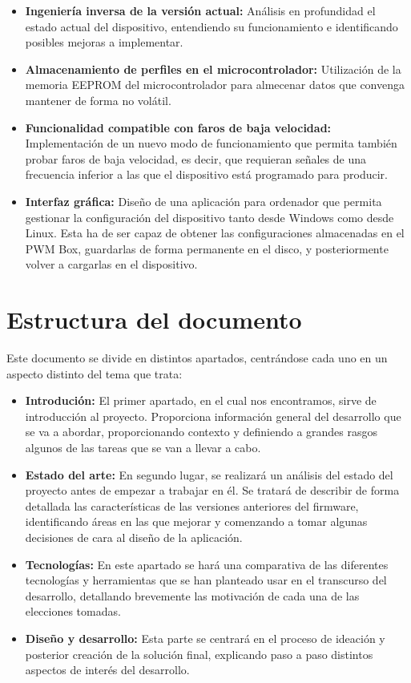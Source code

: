 \begin{itemize}
    \item\textbf{Ingeniería inversa de la versión actual:} Análisis en profundidad el estado actual del dispositivo, entendiendo su funcionamiento e identificando posibles mejoras a implementar.
    \item\textbf{Almacenamiento de perfiles en el microcontrolador:} Utilización de la memoria EEPROM del microcontrolador para almecenar datos que convenga mantener de forma no volátil.
    \item\textbf{Funcionalidad compatible con faros de baja velocidad:} Implementación de un nuevo modo de funcionamiento que permita también probar faros de baja velocidad, es decir, que requieran señales de una frecuencia inferior a las que el dispositivo está programado para producir.
    \item\textbf{Interfaz gráfica:} Diseño de una aplicación para ordenador que permita gestionar la configuración del dispositivo tanto desde Windows como desde Linux. Esta ha de ser capaz de obtener las configuraciones almacenadas en el PWM Box, guardarlas de forma permanente en el disco, y posteriormente volver a cargarlas en el dispositivo.
\end{itemize}

\section{Estructura del documento}

Este documento se divide en distintos apartados, centrándose cada uno en un aspecto distinto del tema que trata:

\begin{itemize}
    \item\textbf{Introdución:} El primer apartado, en el cual nos encontramos, sirve de introducción al proyecto. Proporciona información general del desarrollo que se va a abordar, proporcionando contexto y definiendo a grandes rasgos algunos de las tareas que se van a llevar a cabo.
    \item\textbf{Estado del arte:} En segundo lugar, se realizará un análisis del estado del proyecto antes de empezar a trabajar en él. Se tratará de describir de forma detallada las características de las versiones anteriores del firmware, identificando áreas en las que mejorar y comenzando a tomar algunas decisiones de cara al diseño de la aplicación.
    \item\textbf{Tecnologías:} En este apartado se hará una comparativa de las diferentes tecnologías y herramientas que se han planteado usar en el transcurso del desarrollo, detallando brevemente las motivación de cada una de las elecciones tomadas.
    \item\textbf{Diseño y desarrollo:} Esta parte se centrará en el proceso de ideación y posterior creación de la solución final, explicando paso a paso distintos aspectos de interés del desarrollo.
\end{itemize}

